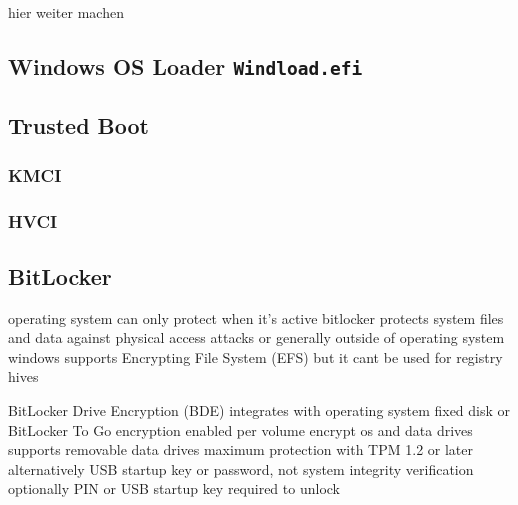 hier weiter machen
\cite[12. Measured Boot]{windows-internals-7-part2}

\subsection{Windows OS Loader \lstinline{Windload.efi}}




\subsection{Trusted Boot}
\subsubsection{KMCI}
\subsubsection{HVCI}
\subsection{BitLocker}


operating system can only protect when it's active
bitlocker protects system files and data against physical access attacks or generally outside of operating system
windows supports Encrypting File System (EFS) but it cant be used for registry hives
\cite[9. BitLocker Drive encryption]{windows-internals-6-part2}

\cite{microsoft-bitlocker-overview}
\cite{microsoft-bitlocker-device-encryption}
BitLocker Drive Encryption (BDE) integrates with operating system
fixed disk or BitLocker To Go
encryption enabled per volume
encrypt os and data drives
supports removable data drives
maximum protection with TPM 1.2 or later
alternatively USB startup key or password, not system integrity verification
optionally PIN or USB startup key required to unlock

